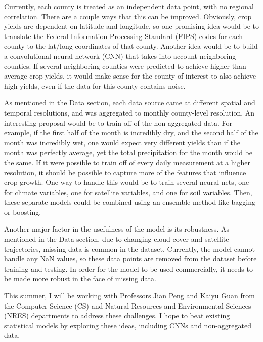 \documentclass[letterpaper]{article}
\begin{document}
Currently, each county is treated as an independent data point, with no regional correlation. There are a couple ways that this can be improved. Obviously, crop yields are dependent on latitude and longitude, so one promising idea would be to translate the Federal Information Processing Standard (FIPS) codes for each county to the lat/long coordinates of that county. Another idea would be to build a convolutional neural network (CNN) that takes into account neighboring counties. If several neighboring counties were predicted to achieve higher than average crop yields, it would make sense for the county of interest to also achieve high yields, even if the data for this county contains noise.

As mentioned in the Data section, each data source came at different spatial and temporal resolutions, and was aggregated to monthly county-level resolution. An interesting proposal would be to train off of the non-aggregated data. For example, if the first half of the month is incredibly dry, and the second half of the month was incredibly wet, one would expect very different yields than if the month was perfectly average, yet the total precipitation for the month would be the same. If it were possible to train off of every daily measurement at a higher resolution, it should be possible to capture more of the features that influence crop growth. One way to handle this would be to train several neural nets, one for climate variables, one for satellite variables, and one for soil variables. Then, these separate models could be combined using an ensemble method like bagging or boosting.

Another major factor in the usefulness of the model is its robustness. As mentioned in the Data section, due to changing cloud cover and satellite trajectories, missing data is common in the dataset. Currently, the model cannot handle any NaN values, so these data points are removed from the dataset before training and testing. In order for the model to be used commercially, it needs to be made more robust in the face of missing data.

This summer, I will be working with Professors Jian Peng and Kaiyu Guan from the Computer Science (CS) and Natural Resources and Environmental Sciences (NRES) departments to address these challenges. I hope to beat existing statistical models by exploring these ideas, including CNNs and non-aggregated data.



\end{document}
